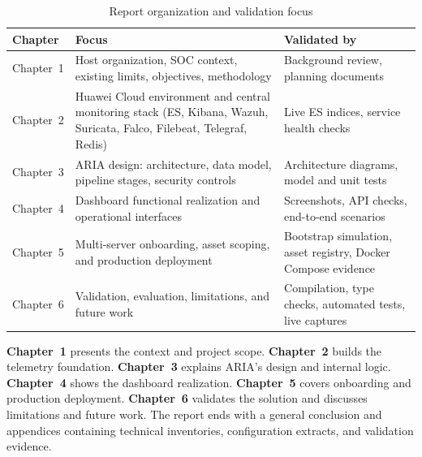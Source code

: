 \begin{table}[H]
\centering
\caption{Report organization and validation focus}
\label{tab:report-org}
\begin{tabularx}{\textwidth}{@{}p{}p{}X@{}}
\toprule
\textbf{Chapter} & \textbf{Focus} & \textbf{Validated by} \\
\midrule
Chapter~1 & Host organization, SOC context, existing limits, objectives, methodology & Background review, planning documents \\
Chapter~2 & Huawei Cloud environment and central monitoring stack (ES, Kibana, Wazuh, Suricata, Falco, Filebeat, Telegraf, Redis) & Live ES indices, service health checks \\
Chapter~3 & ARIA design: architecture, data model, pipeline stages, security controls & Architecture diagrams, model and unit tests \\
Chapter~4 & Dashboard functional realization and operational interfaces & Screenshots, API checks, end-to-end scenarios \\
Chapter~5 & Multi-server onboarding, asset scoping, and production deployment & Bootstrap simulation, asset registry, Docker Compose evidence \\
Chapter~6 & Validation, evaluation, limitations, and future work & Compilation, type checks, automated tests, live captures \\
\bottomrule
\end{tabularx}
\end{table}

\textbf{Chapter~1} presents the context and project scope. \textbf{Chapter~2} builds the telemetry foundation. \textbf{Chapter~3} explains ARIA's design and internal logic. \textbf{Chapter~4} shows the dashboard realization. \textbf{Chapter~5} covers onboarding and production deployment. \textbf{Chapter~6} validates the solution and discusses limitations and future work. The report ends with a general conclusion and appendices containing technical inventories, configuration extracts, and validation evidence.

